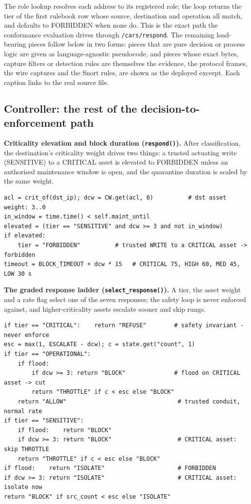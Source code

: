 \noindent The role lookup resolves each address to its registered role; the loop returns the tier of the first rulebook row whose source, destination and operation all match, and defaults to FORBIDDEN when none do. This is the exact path the conformance evaluation drives through \texttt{/cars/respond}. The remaining load-bearing pieces follow below in two forms: pieces that are pure decision or process logic are given as language-agnostic pseudocode, and pieces whose exact bytes, capture filters or detection rules are themselves the evidence, the protocol frames, the wire captures and the Snort rules, are shown as the deployed excerpt. Each caption links to the real source file.

\subsection*{Controller: the rest of the decision-to-enforcement path}

\noindent \textbf{Criticality elevation and block duration (\texttt{respond()}).} After classification, the destination's criticality weight drives two things: a trusted actuating write (SENSITIVE) to a CRITICAL asset is elevated to FORBIDDEN unless an authorised maintenance window is open, and the quarantine duration is scaled by the same weight.

\begin{lstlisting}[style=carssrc,caption={Grey-zone elevation and criticality-scaled block duration.},label={lst:elevate}]
acl = crit_of(dst_ip); dcw = CW.get(acl, 0)          # dst asset weight: 3..0
in_window = time.time() < self.maint_until
elevated = (tier == "SENSITIVE" and dcw >= 3 and not in_window)
if elevated:
    tier = "FORBIDDEN"          # trusted WRITE to a CRITICAL asset -> forbidden
timeout = BLOCK_TIMEOUT + dcw * 15   # CRITICAL 75, HIGH 60, MED 45, LOW 30 s
\end{lstlisting}

\noindent \textbf{The graded response ladder (\texttt{select\_response()}).} A tier, the asset weight and a rate flag select one of the seven responses; the safety loop is never enforced against, and higher-criticality assets escalate sooner and skip rungs.

\begin{lstlisting}[style=carssrc,caption={Criticality-graded, flood-aware response selection.},label={lst:selresp}]
if tier == "CRITICAL":    return "REFUSE"        # safety invariant - never enforce
esc = max(1, ESCALATE - dcw); c = state.get("count", 1)
if tier == "OPERATIONAL":
    if flood:
        if dcw >= 3: return "BLOCK"              # flood on CRITICAL asset -> cut
        return "THROTTLE" if c < esc else "BLOCK"
    return "ALLOW"                                # trusted conduit, normal rate
if tier == "SENSITIVE":
    if flood:    return "BLOCK"
    if dcw >= 3: return "BLOCK"                   # CRITICAL asset: skip THROTTLE
    return "THROTTLE" if c < esc else "BLOCK"
if flood:    return "ISOLATE"                     # FORBIDDEN
if dcw >= 3: return "ISOLATE"                     # CRITICAL asset: isolate now
return "BLOCK" if src_count < esc else "ISOLATE"
\end{lstlisting}

